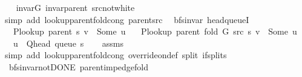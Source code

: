 \begin{isabellebody}
%
\isadelimproof
\ \ %
\endisadelimproof
%
\isatagproof
{}\isamarkupfalse%
\ invar{\isacharunderscore}{\kern0pt}G\ invar{\isacharunderscore}{\kern0pt}parent\ src{\isacharunderscore}{\kern0pt}not{\isacharunderscore}{\kern0pt}white\isanewline
\ \ \isamarkupfalse%
\ {\isacharparenleft}{\kern0pt}simp\ add{\isacharcolon}{\kern0pt}\ lookup{\isacharunderscore}{\kern0pt}parent{\isacharunderscore}{\kern0pt}fold{\isacharunderscore}{\kern0pt}cong{\isacharunderscore}{\kern0pt}{}\ parent{\isacharunderscore}{\kern0pt}src{\isacharparenright}{\kern0pt}%
\endisatagproof
{\isafoldproof}%
%
\isadelimproof
\isanewline
%
\endisadelimproof
%
\isadeliminvisible
\isanewline
%
\endisadeliminvisible
%
\isataginvisible
{}\isamarkupfalse%
\ {\isacharparenleft}{\kern0pt}\ bfs{\isacharunderscore}{\kern0pt}invar{\isacharparenright}{\kern0pt}\ head{\isacharunderscore}{\kern0pt}queueI{\isacharcolon}{\kern0pt}\isanewline
\ \ \ {\isachardoublequoteopen}P{\isacharunderscore}{\kern0pt}lookup\ {\isacharparenleft}{\kern0pt}parent\ s{\isacharparenright}{\kern0pt}\ v\ {\isasymnoteq}\ Some\ u{\isachardoublequoteclose}\isanewline
\ \ \ {\isachardoublequoteopen}P{\isacharunderscore}{\kern0pt}lookup\ {\isacharparenleft}{\kern0pt}parent\ {\isacharparenleft}{\kern0pt}fold\ G\ src\ s{\isacharparenright}{\kern0pt}{\isacharparenright}{\kern0pt}\ v\ {\isacharequal}{\kern0pt}\ Some\ u{\isachardoublequoteclose}\isanewline
\ \ \ {\isachardoublequoteopen}u\ {\isacharequal}{\kern0pt}\ Q{\isacharunderscore}{\kern0pt}head\ {\isacharparenleft}{\kern0pt}queue\ s{\isacharparenright}{\kern0pt}{\isachardoublequoteclose}%
\endisataginvisible
{\isafoldinvisible}%
%
\isadeliminvisible
\isanewline
%
\endisadeliminvisible
%
\isadelimproof
\ \ %
\endisadelimproof
%
\isatagproof
{}\isamarkupfalse%
\ assms\isanewline
\ \ \isamarkupfalse%
\ {\isacharparenleft}{\kern0pt}simp\ add{\isacharcolon}{\kern0pt}\ lookup{\isacharunderscore}{\kern0pt}parent{\isacharunderscore}{\kern0pt}fold{\isacharunderscore}{\kern0pt}cong\ override{\isacharunderscore}{\kern0pt}on{\isacharunderscore}{\kern0pt}def\ split{\isacharcolon}{\kern0pt}\ if{\isacharunderscore}{\kern0pt}splits{\isacharparenleft}{\kern0pt}{}{\isacharparenright}{\kern0pt}{\isacharparenright}{\kern0pt}%
\endisatagproof
{\isafoldproof}%
%
\isadelimproof
\isanewline
%
\endisadelimproof
\isanewline
{}\isamarkupfalse%
\ {\isacharparenleft}{\kern0pt}\ bfs{\isacharunderscore}{\kern0pt}invar{\isacharunderscore}{\kern0pt}not{\isacharunderscore}{\kern0pt}DONE{\isacharparenright}{\kern0pt}\ parent{\isacharunderscore}{\kern0pt}imp{\isacharunderscore}{\kern0pt}edge{\isacharunderscore}{\kern0pt}fold{\isacharcolon}{\kern0pt}\isanewline

\end{isabellebody}
